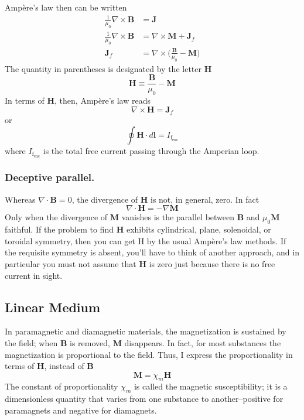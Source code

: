 \documentclass[../../../main.tex]{subfiles}
\begin{document}
Ampère’s law then can be written
\begin{align*}
    \frac{1}{\mu_0}\nabla\times \mathbf{B}&=\mathbf{J}\\
    \frac{1}{\mu_0}\nabla\times \mathbf{B}&=\nabla \times \mathbf{M}+\mathbf{J}_f\\
    \mathbf{J}_f&=\nabla\times\bigg(\frac{\mathbf{B}}{\mu_0}-\mathbf{M}\bigg)
\end{align*}
The quantity in parentheses is designated by the letter \textbf{H}
\begin{equation*}
    \mathbf{H}\equiv\frac{\mathbf{B}}{\mu_0}-\mathbf{M}
\end{equation*}
In terms of \textbf{H}, then, Ampère’s law reads
\begin{equation*}
    \nabla\times\mathbf{H}=\mathbf{J}_f
\end{equation*}
or
\begin{equation*}
    \oint \mathbf{H}\cdot d\mathbf{l}=I_{\text{f}_\text{enc}}
\end{equation*}
where $I_{\text{f}_\text{enc}}$ is the total free current passing through the Amperian loop.

\subsubsection*{Deceptive parallel.} Whereas $\nabla \cdot \mathbf{B} = 0$, the divergence of \textbf{H} is not, in general, zero. In fact 
\begin{equation*}
    \nabla \cdot\mathbf{H}=-\nabla\mathbf{M}
\end{equation*}
Only when the divergence of \textbf{M} vanishes is the parallel between \textbf{B} and $\mu_0\mathbf{M}$ faithful. If the problem to find \textbf{H} exhibits cylindrical, plane, solenoidal, or toroidal symmetry, then you can get H by the usual Ampère’s law methods. If the requisite symmetry is absent, you’ll have to think of another approach, and in particular you must not assume that \textbf{H} is zero just because there is no free current in sight. 

\subsection*{Linear Medium}
In paramagnetic and diamagnetic materials, the magnetization is sustained by the ﬁeld; when \textbf{B} is removed, \textbf{M} disappears. In fact, for most substances the magnetization is proportional to the ﬁeld. Thus, I express the proportionality in terms of \textbf{H}, instead of \textbf{B}
\begin{equation*}
    \mathbf{M}=\chi_m \mathbf{H}
\end{equation*}
The constant of proportionality $\chi_m$ is called the magnetic susceptibility; it is a dimensionless quantity that varies from one substance to another--positive for paramagnets and negative for diamagnets.
\end{document}

